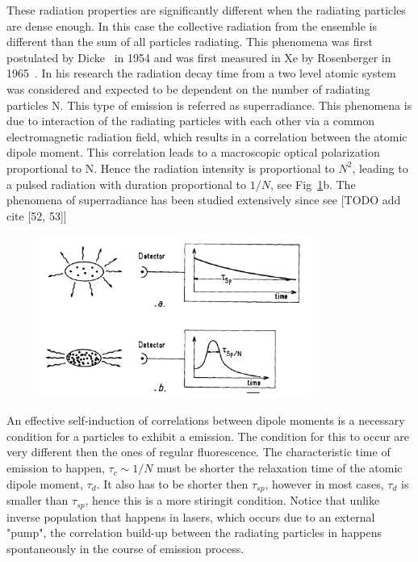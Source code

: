 These radiation properties are significantly different when the radiating particles are dense enough. In this case the collective radiation from  the ensemble is different than the sum of all particles radiating. This phenomena was first postulated by Dicke~\cite{DickeSR} in 1954 and was first measured in Xe by Rosenberger in 1965~\cite{FirstMeasure}. In his research the radiation decay time from a two level atomic system was considered and expected to be dependent on the number of radiating particles N. This type of emission is referred as superradiance. This phenomena is due to interaction of the radiating particles with each other via a common electromagnetic radiation field, which results in a correlation between the atomic dipole moment. This correlation leads to a macroscopic optical polarization proportional to N. Hence the radiation intensity is proportional to $N^2$, leading to a pulsed radiation with duration proportional to $1/N$, see Fig~\ref{fig:emissionType}b. The phenomena of superradiance has been studied extensively since see [TODO add cite [52, 53]]   
\begin{figure}[t!]
	\centering
	\includegraphics[width=0.8\textwidth]{fig01/emissionTypes.png}
	\label{fig:emissionType}
\end{figure}


An effective self-induction of correlations between dipole moments is a necessary condition for a particles to exhibit a \superradiance emission. The condition for this to occur are very different then the ones of regular fluorescence. The characteristic time of \superradiance emission to happen, $\tau_c \sim 1/N $ must be shorter the relaxation time of the atomic dipole moment, $\tau_d$. It also has to be shorter then $\tau_{sp}$, however in most cases, $\tau_{d}$ is smaller than $\tau_{sp}$, hence this is a more stiringit condition. Notice that unlike inverse population that happens in lasers, which occurs due to an external "pump", the correlation build-up between the radiating particles in \superradiance happens spontaneously in the course of emission process.

